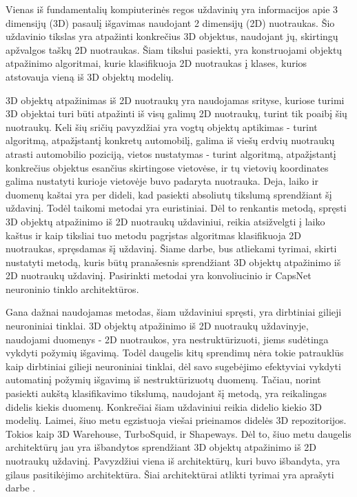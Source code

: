 
Vienas iš fundamentalių kompiuterinės regos uždavinių yra informacijos apie 3 dimensijų (3D) pasaulį išgavimas naudojant 2 dimensijų (2D) nuotraukas. Šio uždavinio tikslas yra atpažinti konkrečius 3D objektus, naudojant jų, skirtingų apžvalgos taškų 2D nuotraukas. Šiam tikslui pasiekti, yra konstruojami objektų atpažinimo algoritmai, kurie klasifikuoja 2D nuotraukas į klases, kurios atstovauja vieną iš 3D objektų modelių.

3D objektų atpažinimas iš 2D nuotraukų yra naudojamas srityse, kuriose turimi 3D objektai turi būti atpažinti iš visų galimų 2D nuotraukų, turint tik poaibį šių nuotraukų. Keli šių sričių pavyzdžiai yra vogtų objektų aptikimas - turint algoritmą, atpažįstantį konkretų automobilį, galima iš viešų erdvių nuotraukų atrasti automobilio poziciją, vietos nustatymas - turint algoritmą, atpažįstantį konkrečius objektus esančius skirtingose vietovėse, ir tų vietovių koordinates galima nustatyti kurioje vietovėje buvo padaryta nuotrauka. Deja, laiko ir duomenų kaštai yra per dideli, kad pasiekti absoliutų tikslumą sprendžiant šį uždavinį. Todėl taikomi metodai yra euristiniai. Dėl to renkantis metodą, spręsti 3D objektų atpažinimo iš 2D nuotraukų uždaviniui, reikia atsižvelgti į laiko kaštus ir kaip tiksliai tuo metodu pagrįstas algoritmas klasifikuoja 2D nuotraukas, spręsdamas šį uždavinį. Šiame darbe, bus atliekami tyrimai, skirti nustatyti metodą, kuris būtų pranašesnis sprendžiant 3D objektų atpažinimo iš 2D nuotraukų uždavinį. Pasirinkti metodai yra konvoliucinio ir CapsNet neuroninio tinklo architektūros.

Gana dažnai naudojamas metodas, šiam uždaviniui spręsti, yra dirbtiniai gilieji neuroniniai tinklai. 3D objektų atpažinimo iš 2D nuotraukų uždavinyje, naudojami duomenys - 2D nuotraukos, yra nestruktūrizuoti, jiems sudėtinga vykdyti požymių išgavimą. Todėl daugelis kitų sprendimų nėra tokie patrauklūs kaip dirbtiniai gilieji neuroniniai tinklai, dėl savo sugebėjimo efektyviai vykdyti automatinį požymių išgavimą iš nestruktūrizuotų duomenų. Tačiau, norint pasiekti aukštą klasifikavimo tikslumą, naudojant šį metodą, yra reikalingas didelis kiekis duomenų. Konkrečiai šiam uždaviniui reikia didelio kiekio 3D modelių. Laimei, šiuo metu egzistuoja viešai prieinamos didelės 3D repozitorijos. Tokios kaip 3D Warehouse, TurboSquid, ir Shapeways. Dėl to, šiuo metu daugelis architektūrų jau yra išbandytos sprendžiant 3D objektų atpažinimo iš 2D nuotraukų uždavinį. Pavyzdžiui viena iš architektūrų, kuri buvo išbandyta, yra gilaus pasitikėjimo architektūra. Šiai architektūrai atlikti tyrimai yra aprašyti darbe \cite{dbnExp}.

